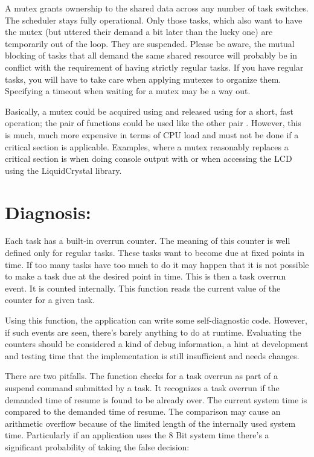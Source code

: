 A mutex grants ownership to the shared data across any number of task
switches. The scheduler stays fully operational. Only those tasks, which
also want to have the mutex (but uttered their demand a bit later than the
lucky one) are temporarily out of the loop. They are suspended. Please be
aware, the mutual blocking of tasks that all demand the same shared
resource will probably be in conflict with the requirement of having
strictly regular tasks. If you have regular tasks, you will have to take
care when applying mutexes to organize them. Specifying a timeout when
waiting for a mutex may be a way out.

Basically, a mutex could be acquired using  and
released using  for a short, fast operation; the
pair of functions could be used like the other pair
. However, this is much, much more
expensive in terms of CPU load and must not be done if a critical section
is applicable. Examples, where a mutex reasonably replaces a critical
section is when doing console output with  or when accessing
the LCD using the LiquidCrystal library.


\section{Diagnosis: }

Each task has a built-in overrun counter. The meaning of this counter is
well defined only for regular tasks. These tasks want to become due at
fixed points in time. If too many tasks have too much to do it may happen
that it is not possible to make a task due at the desired point in time.
This is then a task overrun event. It is counted internally. This function
reads the current value of the counter for a given task.

Using this function, the application can write some self-diagnostic code.
However, if such events are seen, there's barely anything to do at
runtime. Evaluating the counters should be considered a kind of debug
information, a hint at development and testing time that the
implementation is still insufficient and needs changes.

There are two pitfalls. The function checks for a task overrun as part of
a suspend command submitted by a task. It recognizes a task overrun if the
demanded time of resume is found to be already over. The current system
time is compared to the demanded time of resume. The comparison may cause
an arithmetic overflow because of the limited length of the internally
used system time. Particularly if an application uses the 8 Bit system
time there's a significant probability of taking the false decision:

